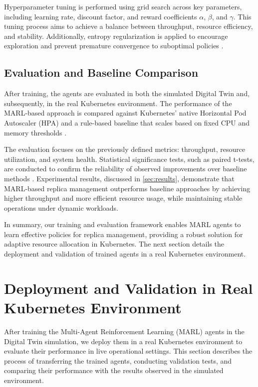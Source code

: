 \documentclass[conference]{IEEEtran}
\begin{document}
Hyperparameter tuning is performed using grid search across key parameters, including learning rate, discount factor, and reward coefficients $\alpha$, $\beta$, and $\gamma$. This tuning process aims to achieve a balance between throughput, resource efficiency, and stability. Additionally, entropy regularization is applied to encourage exploration and prevent premature convergence to suboptimal policies \cite{schulman_ppo}.

\subsection{Evaluation and Baseline Comparison}

After training, the agents are evaluated in both the simulated Digital Twin and, subsequently, in the real Kubernetes environment. The performance of the MARL-based approach is compared against Kubernetes' native Horizontal Pod Autoscaler (HPA) and a rule-based baseline that scales based on fixed CPU and memory thresholds \cite{rosenberg_k8s_autoscaling}.

The evaluation focuses on the previously defined metrics: throughput, resource utilization, and system health. Statistical significance tests, such as paired t-tests, are conducted to confirm the reliability of observed improvements over baseline methods \cite{zhang_marl_k8s}. Experimental results, discussed in \autoref{sec:results}, demonstrate that MARL-based replica management outperforms baseline approaches by achieving higher throughput and more efficient resource usage, while maintaining stable operations under dynamic workloads.

In summary, our training and evaluation framework enables MARL agents to learn effective policies for replica management, providing a robust solution for adaptive resource allocation in Kubernetes. The next section details the deployment and validation of trained agents in a real Kubernetes environment.


\section{Deployment and Validation in Real Kubernetes Environment}
\label{sec:deployment_validation}

After training the Multi-Agent Reinforcement Learning (MARL) agents in the Digital Twin simulation, we deploy them in a real Kubernetes environment to evaluate their performance in live operational settings. This section describes the process of transferring the trained agents, conducting validation tests, and comparing their performance with the results observed in the simulated environment.
\end{document}
